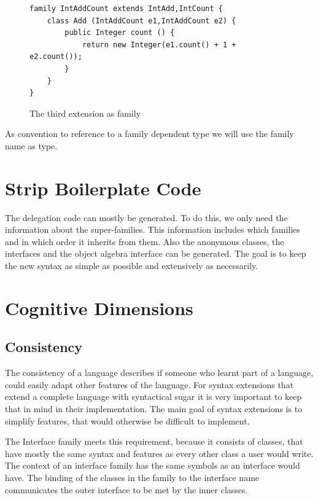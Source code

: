 \documentclass{report}
\begin{document}
\begin{figure}[h]
\begin{lstlisting}[language=exprExt]
family IntAddCount extends IntAdd,IntCount {
    class Add (IntAddCount e1,IntAddCount e2) {
        public Integer count () {
            return new Integer(e1.count() + 1 + e2.count());
        }
    }
}
\end{lstlisting}
\caption{The third extension as family}
\label{thirdExtensionFamily}
\end{figure}

As convention to reference to a family dependent type we will use the family name as type.

\section{Strip Boilerplate Code}

The delegation code can mostly be generated. To do this, we only need the information about the super-families. This information includes which families and in which order it inherits from them. Also the anonymous classes, the interfaces and the object algebra interface can be generated. The goal is to keep the new syntax as simple as possible and extensively as necessarily.

\section{Cognitive Dimensions}

\subsection{Consistency}

The consistency of a language describes if someone who learnt part of a language, could easily adapt other features of the language. For syntax extensions that extend a complete language with syntactical sugar it is very important to keep that in mind in their implementation. The main goal of syntax extensions is to simplify features, that would otherwise be difficult to implement.

The Interface family meets this requirement, because it consists of classes, that have mostly the same syntax and features as every other class a user would write. The context of an interface family has the same symbols as an interface would have. The binding of the classes in the family to the interface name communicates the outer interface to be met by the inner classes.
\end{document}
